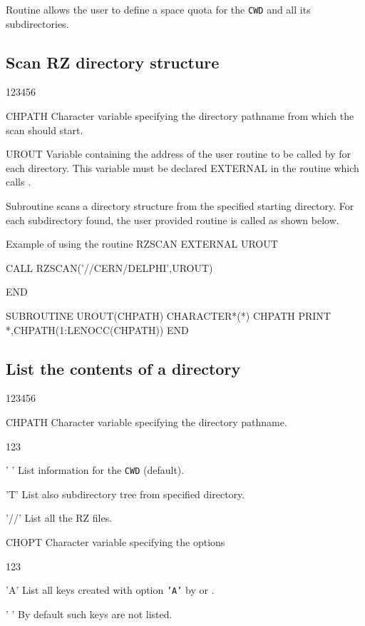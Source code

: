 Routine  allows the user to define a
space quota for the {\tt CWD} and all its subdirectories.


\subsection{Scan RZ directory structure}
\begin{DLtt}{123456}
\item[CHPATH]Character variable specifying the directory pathname
from which the scan should start.
\item[UROUT]Variable containing the address of the user
routine to be called by  for each directory.
This variable must be declared EXTERNAL in the routine
which calls .
\end{DLtt}

Subroutine  scans a directory structure from the specified
starting directory. For each subdirectory found, the user provided
routine  is called as shown below.
\begin{XMPt}{Example of using the routine RZSCAN}
      EXTERNAL UROUT

      CALL RZSCAN('//CERN/DELPHI',UROUT)

      END

      SUBROUTINE UROUT(CHPATH)
      CHARACTER*(*)    CHPATH
      PRINT *,CHPATH(1:LENOCC(CHPATH))
      END

\end{XMPt}

\subsection{List the contents of a directory}

\begin{DLtt}{123456}
\item[CHPATH]Character variable specifying the directory pathname.
\begin{DLtt}{123}
\item[' ']List information for the {\tt CWD} (default).
\item['T']List also subdirectory tree from specified directory.
\item['//']List all the RZ files.
\end{DLtt}
\item[CHOPT]Character variable specifying the options
\begin{DLtt}{123}
\item['A']List all keys created with option {\tt'A'} by 
or .
\item[' ']By default such keys are not listed.
\end{DLtt}
\end{DLtt}

